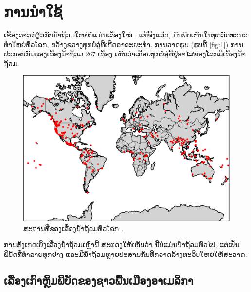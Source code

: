 \documentclass[10pt,twocolumn,letterpaper]{article}
\begin{document}
\section{ການນໍາໃຊ້}

ເຣື່ອງລາວກ່ຽວກັບນ້ຳຖ້ວມໃຫຍ່ບໍ່ແມ່ນເລື່ອງໃໝ່ - ແທ້ຈິງແລ້ວ, ມັນພົບເຫັນໃນທຸກວັດທະນະທໍາໃຫຍ່ທົ່ວໂລກ, ກວ້າງຂວາງທຸກບໍ່ອູ່ທີ່ເກີດອາລະຍະທຳ. ການວາດຮູບ (ຮູບທີ່ \ref{fig:1}) ການປະກອບກັນຂອງເລື່ອງນ້ຳຖ້ວມ 267 ເລື່ອງ \cite{3} ເຫັນວ່າເກືອບທຸກບໍ່ອູ່ທີ່ຢູ່ອາໄສຂອງໂລກມີເລື່ອງນ້ຳຖ້ວມ.

\begin{figure}[h]
\begin{center}
   \includegraphics[width=1\linewidth]{b.png}
\end{center}
   \caption{ສະຖານທີ່ຂອງເລື່ອງນ້ຳຖ້ວມທົ່ວໂລກ \cite{3}.}
\label{fig:1}
\label{fig:onecol}
\end{figure}

ການສັງເກດເບິ່ງເລື່ອງນ້ຳຖ້ວມເຫຼົ່ານີ້ ສະແດງໃຫ້ເຫັນວ່າ ນີ້ບໍ່ແມ່ນນ້ຳຖ້ວມທົ່ວໄປ, ແຕ່ເປັນພິບັດທີ່ທຳລາຍທຸກຢ່າງ ແລະມີນ້ຳຖ້ວມຫຼາຍປະສານກັນທີ່ກວາດລ້າງທະວິບໃຫຍ່ໃຫ້ສະອາດ.

\subsection{ເລື່ອງເກົາຫຼິມພິບັດຂອງຊາວພື້ນເມືອງອາເມລິກາ}
\end{document}
